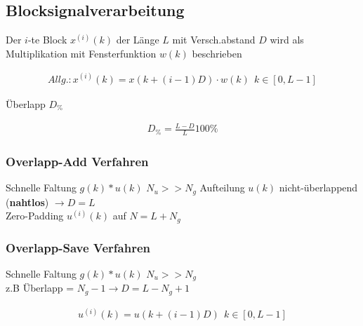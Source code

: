 \documentclass[10pt,a4paper]{article}
\begin{document}
  \subsection{Blocksignalverarbeitung}
  Der $i$-te Block $x^{(i)}(k)$ der Länge $L$ mit Versch.abstand $D$ 
  wird als Multiplikation mit Fensterfunktion $w(k)$ beschrieben
  \begin{mdframed}[style=exercise]
    \begin{align}
        Allg.:
        x^{(i)}(k) = x(k+(i-1)D) \cdot w(k)\ \ k\in[0,L-1] 
    \end{align}
  \end{mdframed}
  Überlapp $D_\%$
  \begin{mdframed}[style=exercise]
    \begin{align}
        D_\% = \frac{L-D}{L}100\%
    \end{align}
  \end{mdframed}
  \subsubsection{Overlapp-Add Verfahren}
  Schnelle Faltung $g(k)*u(k)$ $N_u >> N_g$ 
  Aufteilung $u(k)$ nicht-überlappend (\textbf{nahtlos}) $\rightarrow D=L$ \\
  Zero-Padding $u^{(i)}(k)$ auf $N=L+N_g$ 
  \subsubsection{Overlapp-Save Verfahren}
  Schnelle Faltung $g(k)*u(k)$ $N_u >> N_g$ \\
  z.B Überlapp = $N_g-1 \rightarrow D=L-N_g+1$ \\
  \begin{mdframed}[style=exercise]
    \begin{align}
        u^{(i)}(k) = u(k+(i-1)D) \ \ k\in[0,L-1]
    \end{align}
  \end{mdframed}
\end{document}

